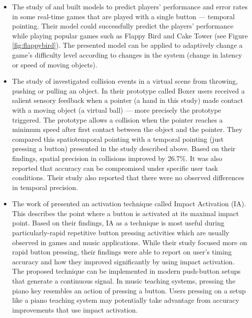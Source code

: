 \documentclass[manuscript,screen]{acmart}
\begin{document}
\begin{itemize}
\item The study of  and  built models to predict players’ performance and error rates in some real-time games that are played with a single button — temporal pointing. Their model could successfully predict the players’ performance while playing popular games such as Flappy Bird and Cake Tower (see Figure \ref{fig:flappybird}). The presented model can be applied to adaptively change a game’s difficulty level according to changes in the system (change in latency or speed of moving objects). \\
\item The study of  investigated collision events in a virtual scene from throwing, pushing or pulling an object.  In their prototype called Boxer users received a salient sensory feedback when a pointer (a hand in this study) made contact with a moving object (a virtual ball) — more precisely the prototype triggered. The prototype allows a collision when the pointer reaches a minimum speed after first contact between the object and the pointer. They compared this spatiotemporal pointing with a temporal pointing (just pressing a button) presented in the study described above. Based on their findings, spatial precision in collisions improved by 26.7\%. It was also reported that accuracy can be compromised under specific user task conditions. Their study also reported that there were no observed differences in temporal precision. \\
\item The work of  presented an activation technique called Impact Activation (IA). This describes the point where a button is activated at its maximal impact point. Based on their findings, IA as a technique is most useful during particularly-rapid repetitive button pressing activities which are usually observed in games and music applications. While their study focused more on rapid button pressing, their findings were able to report on user’s timing accuracy and how they improved significantly by using impact activation. The proposed technique can be implemented in modern push-button setups that generate a continuous signal. In music teaching systems, pressing the piano key resembles an action of pressing a button. Users pressing on a setup like a piano teaching system may potentially take advantage from accuracy improvements that use impact activation. 
\end{itemize}
\end{document}
